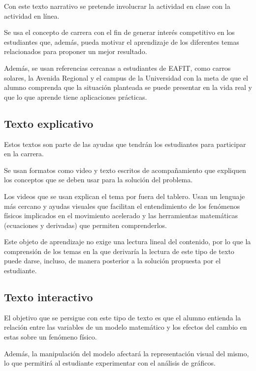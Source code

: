 \documentclass[twoside,letterpaper,12pt]{report}
\begin{document}
Con este texto narrativo se pretende involucrar la actividad en clase con la actividad en línea. 

Se usa el concepto de carrera con el fin de generar interés competitivo en los estudiantes que, además, pueda motivar el aprendizaje de los diferentes temas relacionados para proponer un mejor resultado.

Además, se usan referencias cercanas a estudiantes de EAFIT, como carros solares, la Avenida Regional y el campus de la Universidad con la meta de que el alumno comprenda que la situación planteada se puede presentar en la vida real y que lo que aprende tiene aplicaciones prácticas.


\subsection{Texto explicativo} %
\label{sub:texto_explicativo}

Estos textos son parte de las ayudas que tendrán los estudiantes para participar en la carrera.

Se usan formatos como video y texto escritos de acompañamiento que expliquen los conceptos que se deben usar para la solución del problema.

Los videos que se usan explican el tema por fuera del tablero. Usan un lenguaje más cercano y ayudas visuales que facilitan el entendimiento de los fenómenos físicos implicados en el movimiento acelerado y las herramientas matemáticas (ecuaciones y derivadas) que permiten comprenderlos.

Este objeto de aprendizaje no exige una lectura lineal del contenido, por lo que la comprensión de los temas en la que derivaría la lectura de este tipo de texto puede darse, incluso, de manera posterior a la solución propuesta por el estudiante.


\subsection{Texto interactivo} %
\label{sub:texto_interactivo}

El objetivo que se persigue con este tipo de texto es que el alumno entienda la relación entre las variables de un modelo matemático y los efectos del cambio en estas sobre un fenómeno físico.

Además, la manipulación del modelo afectará la representación visual del mismo, lo que permitirá al estudiante experimentar con el análisis de gráficos.
\end{document}
